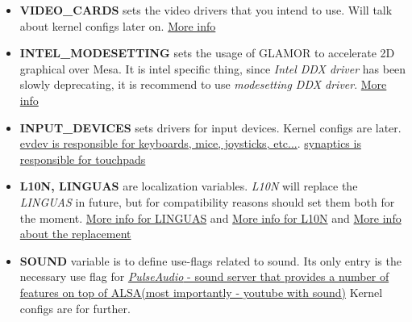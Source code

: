 \documentclass[11pt,a4paper]{article}
\begin{document}
\begin{itemize}
                        

                    \item \textbf{VIDEO\_CARDS} sets the video drivers that you intend to use. Will talk about kernel configs later on. \href{https://wiki.gentoo.org/wiki/Xorg/Guide#make.conf}{More info}

                        

                    \item \textbf{INTEL\_MODESETTING} sets the usage of GLAMOR to accelerate 2D graphical over Mesa. It is intel specific thing, since \textit{Intel DDX driver} has been slowly deprecating, it is recommend to use \textit{modesetting DDX driver}. \href{https://wiki.gentoo.org/wiki/Intel#Modesetting_DDX}{More info}

                        

                    \item \textbf{INPUT\_DEVICES} sets drivers for input devices. Kernel configs are later. \href{https://wiki.gentoo.org/wiki/Evdev#Driver}{evdev is responsible for keyboards, mice, joysticks, etc...}. \href{https://wiki.gentoo.org/wiki/Synaptics#Driver}{synaptics is responsible for touchpads}

                        

                    \item \textbf{L10N, LINGUAS} are localization variables. \textit{L10N} will replace the \textit{LINGUAS} in future, but for compatibility reasons should set them both for the moment. \href{https://wiki.gentoo.org/wiki/Localization/Guide#LINGUAS}{More info for LINGUAS} and \href{https://wiki.gentoo.org/wiki/Localization/Guide#L10N}{More info for L10N} and \href{https://www.gentoo.org/support/news-items/2016-06-23-l10n-use_expand.html}{More info about the replacement}

                        

                    \item \textbf{SOUND} variable is to define use-flags related to sound. Its only entry is the necessary use flag for \href{https://wiki.gentoo.org/wiki/PulseAudio#Software}{\textit{PulseAudio} - sound server that provides a number of features on top of ALSA(most importantly - youtube with sound)} Kernel configs are for further.


\end{itemize}
\end{document}
